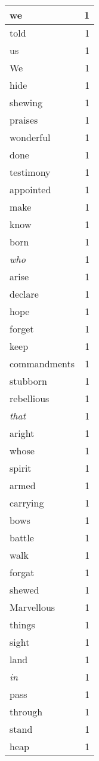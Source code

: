 \begin{center}
\begin{longtable}{l|r}
we & 1\\ \hline 
told & 1\\ \hline 
us & 1\\ \hline 
We & 1\\ \hline 
hide & 1\\ \hline 
shewing & 1\\ \hline 
praises & 1\\ \hline 
wonderful & 1\\ \hline 
done & 1\\ \hline 
testimony & 1\\ \hline 
appointed & 1\\ \hline 
make & 1\\ \hline 
know & 1\\ \hline 
born & 1\\ \hline 
\emph{who} & 1\\ \hline 
arise & 1\\ \hline 
declare & 1\\ \hline 
hope & 1\\ \hline 
forget & 1\\ \hline 
keep & 1\\ \hline 
commandments & 1\\ \hline 
stubborn & 1\\ \hline 
rebellious & 1\\ \hline 
\emph{that} & 1\\ \hline 
aright & 1\\ \hline 
whose & 1\\ \hline 
spirit & 1\\ \hline 
armed & 1\\ \hline 
carrying & 1\\ \hline 
bows & 1\\ \hline 
battle & 1\\ \hline 
walk & 1\\ \hline 
forgat & 1\\ \hline 
shewed & 1\\ \hline 
Marvellous & 1\\ \hline 
things & 1\\ \hline 
sight & 1\\ \hline 
land & 1\\ \hline 
\emph{in} & 1\\ \hline 
pass & 1\\ \hline 
through & 1\\ \hline 
stand & 1\\ \hline 
heap & 1\\ \hline 

\end{longtable}
\end{center}
